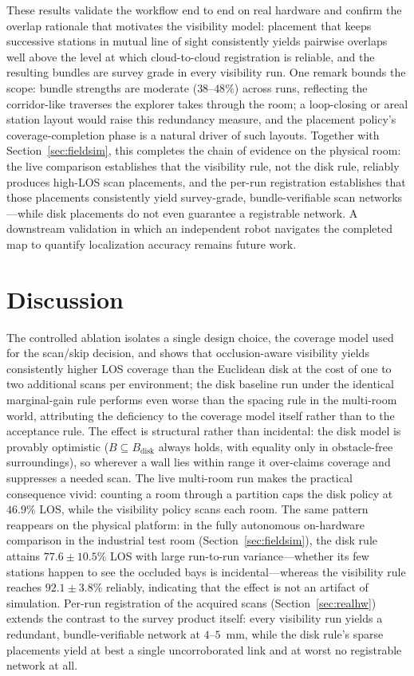 \documentclass[sensors,article,submit,pdftex,moreauthors]{Definitions/mdpi}
\begin{document}
These results validate the workflow end to end on real hardware and confirm the
overlap rationale that motivates the visibility model: placement that keeps
successive stations in mutual line of sight consistently yields pairwise
overlaps well above the level at which cloud-to-cloud registration is reliable,
and the resulting bundles are survey grade in every visibility run. One remark
bounds the scope: bundle strengths are moderate ($38$--$48\%$) across runs,
reflecting the corridor-like traverses the explorer takes through the room; a
loop-closing or areal station layout would raise this redundancy measure, and
the placement policy's coverage-completion phase is a natural driver of such
layouts. Together with Section~\ref{sec:fieldsim}, this completes the chain of
evidence on the physical room: the live comparison establishes that the
visibility rule, not the disk rule, reliably produces high-LOS scan placements,
and the per-run registration establishes that those placements consistently
yield survey-grade, bundle-verifiable scan networks---while disk placements do
not even guarantee a registrable network. A downstream validation in which an
independent robot navigates the completed map to quantify localization accuracy
remains future work.

\section{Discussion}
\label{sec:discussion}

The controlled ablation isolates a single design choice, the coverage model used
for the scan/skip decision, and shows that occlusion-aware visibility yields
consistently higher LOS coverage than the Euclidean disk at the cost of one to
two additional scans per environment; the disk baseline run under the identical
marginal-gain rule performs even worse than the spacing rule in the multi-room
world, attributing the deficiency to the coverage model itself rather than to
the acceptance rule. The effect is structural rather than incidental:
the disk model is provably optimistic ($B\subseteq B_{\mathrm{disk}}$ always
holds, with equality only in obstacle-free surroundings), so wherever a wall lies within
range it over-claims coverage and suppresses a needed scan. The live multi-room
run makes the practical consequence vivid: counting a room through a partition
caps the disk policy at $46.9\%$ LOS, while the visibility policy scans each room.
The same pattern reappears on the physical platform: in the fully autonomous
on-hardware comparison in the industrial test room (Section~\ref{sec:fieldsim}),
the disk rule attains $77.6\pm10.5\%$ LOS with large run-to-run variance---whether
its few stations happen to see the occluded bays is incidental---whereas the
visibility rule reaches $92.1\pm3.8\%$ reliably, indicating that the effect is
not an artifact of simulation. Per-run registration of the acquired scans
(Section~\ref{sec:realhw}) extends the contrast to the survey product itself:
every visibility run yields a redundant, bundle-verifiable network at
$4$--$5$~mm, while the disk rule's sparse placements yield at best a single
uncorroborated link and at worst no registrable network at all.
\end{document}
